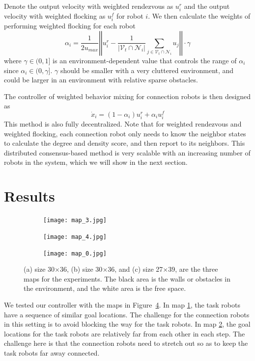\documentclass[../main.tex]{subfiles}
\begin{document}
Denote the output velocity with weighted rendezvous as $u^r_i$ and the output velocity with weighted flocking as $u^f_i$ for robot $i$. We then calculate the weights of performing weighted flocking for each robot
\begin{equation} 
\alpha_i = \frac{1}{2u_{max}}\left|\left|u_i^r - \frac{1}{|\mathcal{V}_t \cap \mathcal{N}_i|} \sum_{j \in \mathcal{V}_t \cap \mathcal{N}_i}u_j\right|\right| \cdot \gamma
\end{equation}
where $\gamma \in (0, 1]$ is an environment-dependent value that controls the range of $\alpha_i$ since $\alpha_i \in (0, \gamma]$. $\gamma$ should be smaller with a very cluttered environment, and could be larger in an environment with relative sparse obstacles.

The controller of weighted behavior mixing for connection robots is then designed as
\begin{equation} 
\dot x_i = (1 - \alpha_i) u_i^r + \alpha_i u_i^f
\end{equation}
This method is also fully decentralized. Note that for weighted rendezvous and weighted flocking, each connection robot only needs to know the neighbor states to calculate the degree and density score, and then report to its neighbors. This distributed consensus-based method is very scalable with an increasing number of robots in the system, which we will show in the next section.

\section{Results}
\begin{figure}
\centering
\begin{subfigure}{0.28\textwidth}
\texttt{[image: map\_3.jpg]}
 
\caption{}
\label{fig:map_1}
\end{subfigure}
\begin{subfigure}{0.28\textwidth}
\texttt{[image: map\_4.jpg]}
 
\caption{}
\label{fig:map_2}
\end{subfigure}
\begin{subfigure}{0.34\textwidth}
\texttt{[image: map\_0.jpg]}
 
\caption{}
\label{fig:map_3}
\end{subfigure}
\caption{(a) size 30$\times$36, (b) size 30$\times$36, and (c) size 27$\times$39, are the three maps for the experiments. The black area is the walls or obstacles in the environment, and the white area is the free space.}
\label{fig:maps}
\end{figure}
We tested our controller with the maps in Figure~\ref{fig:maps}. In map  \ref{fig:map_1}, the task robots have a sequence of similar goal locations. The challenge for the connection robots in this setting is to avoid blocking the way for the task robots. In map \ref{fig:map_2}, the goal locations for the task robots are relatively far from each other in each step. The challenge here is that the connection robots need to stretch out so as to keep the task robots far away connected.
\end{document}
